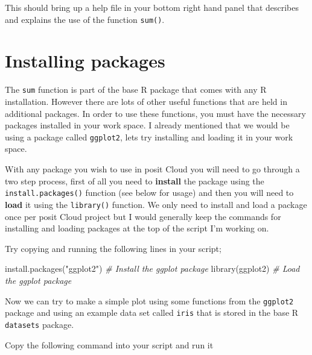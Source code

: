 \documentclass[
]{book}
\newenvironment{Shaded}{\begin{snugshade}}{\end{snugshade}}
\newcommand{\CommentTok}[1]{\textcolor[rgb]{0.56,0.35,0.01}{\textit{#1}}}
\newcommand{\FunctionTok}[1]{\textcolor[rgb]{0.00,0.00,0.00}{#1}}
\newcommand{\NormalTok}[1]{#1}
\newcommand{\StringTok}[1]{\textcolor[rgb]{0.31,0.60,0.02}{#1}}
\begin{document}
This should bring up a help file in your bottom right hand panel that describes and explains the use of the function \texttt{sum()}.

\hypertarget{installing-packages}{%
\section{Installing packages}\label{installing-packages}}

The \texttt{sum} function is part of the base R package that comes with any R installation. However there are lots of other useful functions that are held in additional packages. In order to use these functions, you must have the necessary packages installed in your work space. I already mentioned that we would be using a package called \texttt{ggplot2}, lets try installing and loading it in your work space.

With any package you wish to use in posit Cloud you will need to go through a two step process, first of all you need to \textbf{install} the package using the \texttt{install.packages()} function (see below for usage) and then you will need to \textbf{load} it using the \texttt{library()} function. We only need to install and load a package once per posit Cloud project but I would generally keep the commands for installing and loading packages at the top of the script I'm working on.

Try copying and running the following lines in your script;

\begin{Shaded}
\begin{Highlighting}[]
\FunctionTok{install.packages}\NormalTok{(}\StringTok{"ggplot2"}\NormalTok{) }\CommentTok{\# Install the ggplot package}
\FunctionTok{library}\NormalTok{(ggplot2) }\CommentTok{\# Load the ggplot package}
\end{Highlighting}
\end{Shaded}

Now we can try to make a simple plot using some functions from the \texttt{ggplot2} package and using an example data set called \texttt{iris} that is stored in the base R \texttt{datasets} package.

Copy the following command into your script and run it
\end{document}
